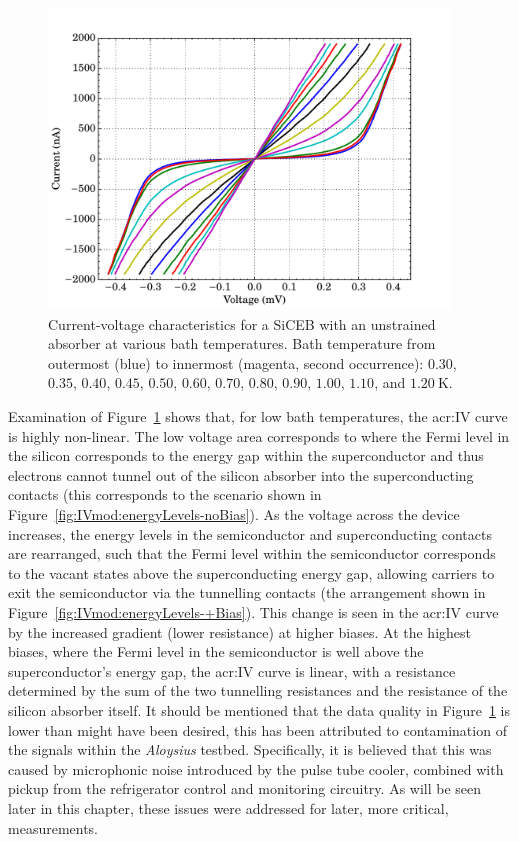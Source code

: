 \begin{figure}[tb]
\begin{center}
\includegraphics[width = 0.95\textwidth]{figures/control_IVs}
\caption[Current-voltage characteristics for a SiCEB with an unstrained absorber]{Current-voltage characteristics for a SiCEB with an unstrained absorber at various bath temperatures. Bath temperature from outermost (blue) to innermost (magenta, second occurrence): $0.30$, $0.35$, $0.40$, $0.45$, $0.50$, $0.60$, $0.70$, $0.80$, $0.90$, $1.00$, $1.10$, and $1.20~\mathrm{K}$.}
\label{fig:controlIVs}
\end{center}
\end{figure}
\par 
Examination of Figure~\ref{fig:controlIVs} shows that, for low bath temperatures, the \gls{acr:IV} curve is highly non-linear. The low voltage area corresponds to where the Fermi level in the silicon corresponds to the energy gap within the superconductor and thus electrons cannot tunnel out of the silicon absorber into the superconducting contacts (this corresponds to the scenario shown in Figure~\ref{fig:IVmod:energyLevels-noBias}). As the voltage across the device increases, the energy levels in the semiconductor and superconducting contacts are rearranged, such that the Fermi level within the semiconductor corresponds to the vacant states above the superconducting energy gap, allowing carriers to exit the semiconductor via the tunnelling contacts (the arrangement shown in Figure~\ref{fig:IVmod:energyLevels-+Bias}). This change is seen in the \gls{acr:IV} curve by the increased gradient (lower resistance) at higher biases. At the highest biases, where the Fermi level in the semiconductor is well above the superconductor's energy gap, the \gls{acr:IV}  curve is linear, with a resistance determined by the sum of the two tunnelling resistances and the resistance of the silicon absorber itself. It should be mentioned that the data quality in Figure~\ref{fig:controlIVs} is lower than might have been desired, this has been attributed to contamination of the signals within the \textit{Aloysius} testbed. Specifically, it is believed that this was caused by microphonic noise introduced by the pulse tube cooler, combined with pickup from the refrigerator control and monitoring circuitry. As will be seen later in this chapter, these issues were addressed for later, more critical, measurements.
